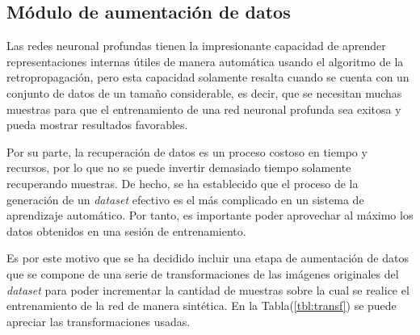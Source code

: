     \subsection{Módulo de aumentación de datos}\label{sec:aumentacion}
    Las redes neuronal profundas tienen la impresionante capacidad de aprender representaciones internas útiles de manera automática 
    usando el algoritmo de la retropropagación, pero esta capacidad solamente resalta cuando se cuenta con un conjunto de datos 
    de un tamaño considerable, es decir, que se necesitan muchas muestras para que el entrenamiento de una red neuronal profunda 
    sea exitosa y pueda mostrar resultados favorables. 
    
    Por su parte, la recuperación de datos es un proceso costoso en tiempo y recursos, por lo que no se puede invertir demasiado 
    tiempo solamente recuperando muestras. De hecho, se ha establecido que el proceso de la generación de un \textit{dataset} efectivo 
    es el más complicado en un sistema de aprendizaje automático. Por tanto, es importante poder aprovechar al máximo los datos 
    obtenidos en una sesión de entrenamiento.

    Es por este motivo que se ha decidido incluir una etapa de aumentación de datos que se compone de una serie de transformaciones 
    de las imágenes originales del \textit{dataset} para poder incrementar la cantidad de muestras sobre la cual se realice el 
    entrenamiento de la red de manera sintética. En la Tabla(\ref{tbl:transf}) se puede apreciar las transformaciones usadas.
    
